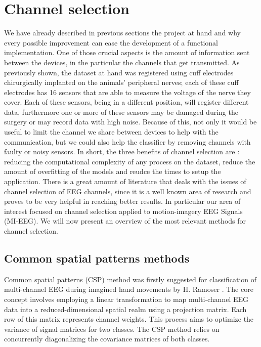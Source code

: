 \documentclass{Configuration_Files/PoliMi3i_thesis}
\begin{document}
\section{Channel selection}

We have already described in previous sections the project at hand and why every possible improvement can ease the development of a functional implementation.
One of those crucial aspects is the amount of information sent between the devices, in the particular the channels that get transmitted.
As previously shown, the dataset at hand was registered using cuff electrodes chirurgically implanted on the animals' peripheral nerves; each of these cuff electrodes has 16 sensors that are able to measure the voltage of the nerve they cover.
Each of these sensors, being in a different position, will register different data, furthermore one or more of these sensors may be damaged during the surgery or may record data with high noise.
Because of this, not only it would be useful to limit the channel we share between devices to help with the communication, but we could also help the classifier by removing channels with faulty or noisy sensors.
In short, the three benefits of channel selection are : reducing the computational complexity of any process on the dataset, reduce the amount of overfitting of the models and reudce the times to setup the application. \cite{alotaibyReviewChannelSelection2015}
There is a great amount of literature that deals with the issues of channel selection of EEG channels, since it is a well known area of research and proves to be very helpful in reaching better results.
In particular our area of interest focused on channel selection applied to motion-imagery EEG Signals (MI-EEG).
We will now present an overview of the most relevant methods for channel selection.

\subsection{Common spatial patterns methods}

Common spatial patterns (CSP) method was firstly suggested for classification of multi-channel EEG during imagined hand movements by H. Ramoser \cite{ramoserOptimalSpatialFiltering2000}. The core concept involves employing a linear transformation to map multi-channel EEG data into a reduced-dimensional spatial realm using a projection matrix. Each row of this matrix represents channel weights. This process aims to optimize the variance of signal matrices for two classes. The CSP method relies on concurrently diagonalizing the covariance matrices of both classes. \cite{abdullahEEGChannelSelection2022}
\end{document}
